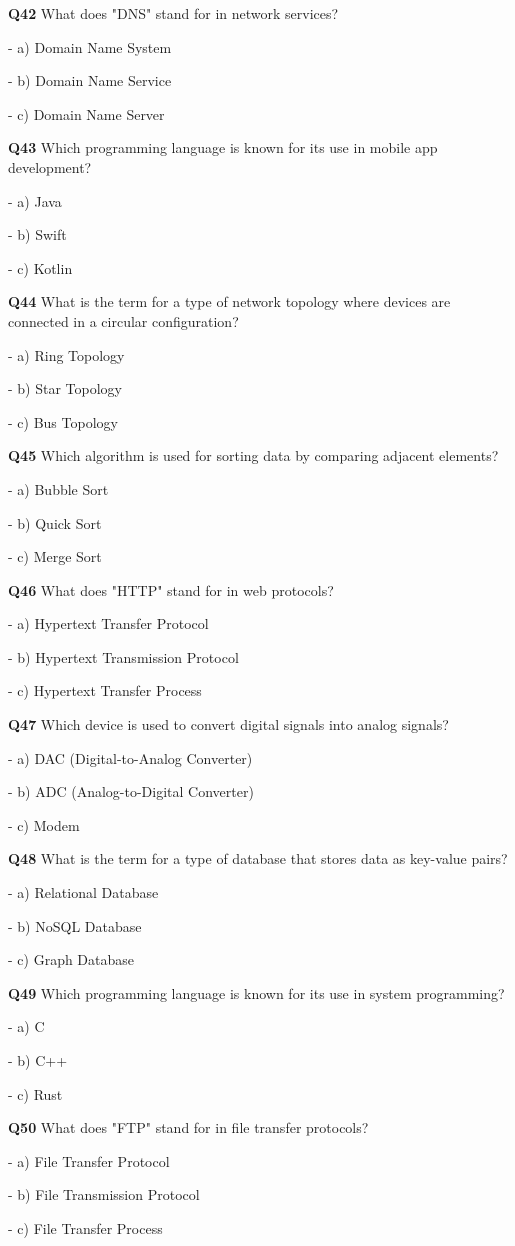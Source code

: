 \textbf{Q42} What does "DNS" stand for in network services?\par
\quad - a) Domain Name System\par
\quad - b) Domain Name Service\par
\quad - c) Domain Name Server\par

\textbf{Q43} Which programming language is known for its use in mobile app development?\par
\quad - a) Java\par
\quad - b) Swift\par
\quad - c) Kotlin\par

\textbf{Q44} What is the term for a type of network topology where devices are connected in a circular configuration?\par
\quad - a) Ring Topology\par
\quad - b) Star Topology\par
\quad - c) Bus Topology\par

\textbf{Q45} Which algorithm is used for sorting data by comparing adjacent elements?\par
\quad - a) Bubble Sort\par
\quad - b) Quick Sort\par
\quad - c) Merge Sort\par

\textbf{Q46} What does "HTTP" stand for in web protocols?\par
\quad - a) Hypertext Transfer Protocol\par
\quad - b) Hypertext Transmission Protocol\par
\quad - c) Hypertext Transfer Process\par

\textbf{Q47} Which device is used to convert digital signals into analog signals?\par
\quad - a) DAC (Digital-to-Analog Converter)\par
\quad - b) ADC (Analog-to-Digital Converter)\par
\quad - c) Modem\par

\textbf{Q48} What is the term for a type of database that stores data as key-value pairs?\par
\quad - a) Relational Database\par
\quad - b) NoSQL Database\par
\quad - c) Graph Database\par

\textbf{Q49} Which programming language is known for its use in system programming?\par
\quad - a) C\par
\quad - b) C++\par
\quad - c) Rust\par

\textbf{Q50} What does "FTP" stand for in file transfer protocols?\par
\quad - a) File Transfer Protocol\par
\quad - b) File Transmission Protocol\par
\quad - c) File Transfer Process\par